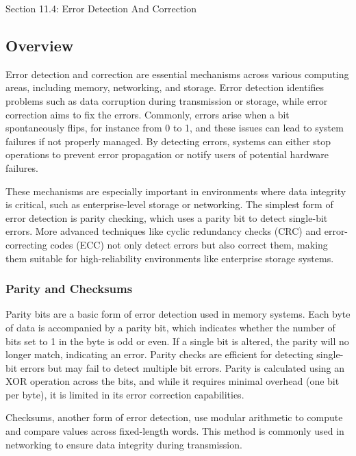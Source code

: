 \begin{notes}{Section 11.4: Error Detection And Correction}

    \subsection*{Overview}
    
    Error detection and correction are essential mechanisms across various computing areas, including memory, networking, and storage. Error detection identifies problems such as data corruption 
    during transmission or storage, while error correction aims to fix the errors. Commonly, errors arise when a bit spontaneously flips, for instance from 0 to 1, and these issues can lead to system 
    failures if not properly managed. By detecting errors, systems can either stop operations to prevent error propagation or notify users of potential hardware failures.
    
    These mechanisms are especially important in environments where data integrity is critical, such as enterprise-level storage or networking. The simplest form of error detection is parity checking, 
    which uses a parity bit to detect single-bit errors. More advanced techniques like cyclic redundancy checks (CRC) and error-correcting codes (ECC) not only detect errors but also correct them, 
    making them suitable for high-reliability environments like enterprise storage systems.

    \subsubsection*{Parity and Checksums}
    
    Parity bits are a basic form of error detection used in memory systems. Each byte of data is accompanied by a parity bit, which indicates whether the number of bits set to 1 in the byte is odd or 
    even. If a single bit is altered, the parity will no longer match, indicating an error. Parity checks are efficient for detecting single-bit errors but may fail to detect multiple bit errors. Parity 
    is calculated using an XOR operation across the bits, and while it requires minimal overhead (one bit per byte), it is limited in its error correction capabilities.
    
    Checksums, another form of error detection, use modular arithmetic to compute and compare values across fixed-length words. This method is commonly used in networking to ensure data integrity 
    during transmission.


\end{notes}
